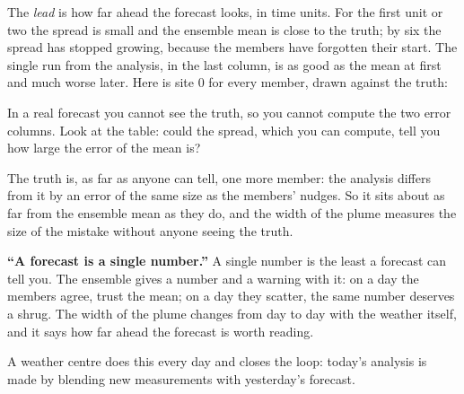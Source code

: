 

\noindent
The \emph{lead} is how far ahead the forecast looks, in time units. For the
first unit or two the spread is small and the ensemble mean is close to the
truth; by six the spread has stopped growing, because the members have
forgotten their start. The single run from the analysis, in the last column,
is as good as the mean at first and much worse later. Here is site 0 for
every member, drawn against the truth:


\begin{think}
In a real forecast you cannot see the truth, so you cannot compute the two
error columns. Look at the table: could the spread, which you can compute,
tell you how large the error of the mean is?
\end{think}
The truth is, as far as anyone can tell, one more member: the analysis
differs from it by an error of the same size as the members' nudges. So it
sits about as far from the ensemble mean as they do, and the width of the
plume measures the size of the mistake without anyone seeing the truth.

\begin{trapbox}
\textbf{\enquote{A forecast is a single number.}} A single number is the
least a forecast can tell you. The ensemble gives a number and a warning
with it: on a day the members agree, trust the mean; on a day they scatter,
the same number deserves a shrug. The width of the plume changes from day to
day with the weather itself, and it says how far ahead the forecast is worth
reading.
\end{trapbox}

\noindent
A weather centre does this every day and closes the loop: today's analysis
is made by blending new measurements with yesterday's forecast.


